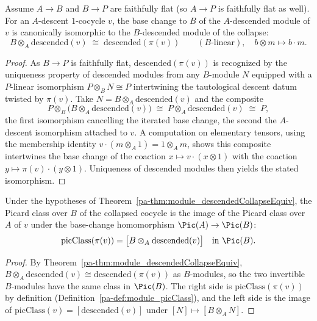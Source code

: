 \begin{theorem}
  \label{pa-thm:module_descendedCollapseEquiv}
  \leanok

  Assume \(A \to B\) and \(B \to P\) are faithfully flat (so \(A \to P\) is faithfully flat as
  well).  For an \(A\)-descent \(1\)-cocycle \(v\), the base change to \(B\) of the
  \(A\)-descended module of \(v\) is canonically isomorphic to the \(B\)-descended module of the
  collapse:
  \[
    B \otimes_A \mathrm{descended}(v) \;\cong\; \mathrm{descended}(\pi(v))
    \qquad (B\text{-linear}),\quad b \otimes m \mapsto b \cdot m.
  \]
\end{theorem}
\begin{proof}
  \leanok
  As \(B \to P\) is faithfully flat, \(\mathrm{descended}(\pi(v))\) is recognized by the
  uniqueness property of descended modules from any \(B\)-module \(N\) equipped with a
  \(P\)-linear isomorphism \(P \otimes_B N \cong P\) intertwining the tautological descent datum
  twisted by \(\pi(v)\).  Take \(N = B \otimes_A \mathrm{descended}(v)\) and the composite
  \[
    P \otimes_B \bigl(B \otimes_A \mathrm{descended}(v)\bigr) \;\cong\; P \otimes_A
    \mathrm{descended}(v) \;\cong\; P,
  \]
  the first isomorphism cancelling the iterated base change, the second the \(A\)-descent
  isomorphism attached to \(v\).  A computation on elementary tensors, using the membership
  identity \(v \cdot (m \otimes_A 1) = 1 \otimes_A m\), shows this composite intertwines the
  base change of the coaction \(x \mapsto v \cdot (x \otimes 1)\) with the coaction \(y \mapsto
  \pi(v) \cdot (y \otimes 1)\).  Uniqueness of descended modules then yields the stated
  isomorphism.
\end{proof}

\begin{theorem}
  \label{pa-thm:module_picClass_collapse}
  \leanok

  Under the hypotheses of Theorem~\ref{pa-thm:module_descendedCollapseEquiv}, the Picard class over
  \(B\) of the collapsed cocycle is the image of the Picard class over \(A\) of \(v\) under the
  base-change homomorphism \(\Pic(A) \to \Pic(B)\):
  \[
    \mathrm{picClass}(\pi(v)) = \bigl[B \otimes_A \mathrm{descended}(v)\bigr] \quad\text{in }
    \Pic(B).
  \]
\end{theorem}
\begin{proof}
  \leanok
  By Theorem~\ref{pa-thm:module_descendedCollapseEquiv}, \(B \otimes_A \mathrm{descended}(v) \cong
  \mathrm{descended}(\pi(v))\) as \(B\)-modules, so the two invertible \(B\)-modules have the
  same class in \(\Pic(B)\).  The right side is \(\mathrm{picClass}(\pi(v))\) by definition
  (Definition~\ref{pa-def:module_picClass}), and the left side is the image of
  \(\mathrm{picClass}(v) = [\mathrm{descended}(v)]\) under \([N] \mapsto [B \otimes_A N]\).
\end{proof}

